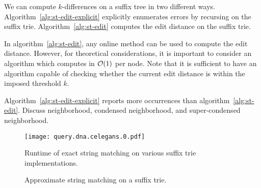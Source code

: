 We can compute $k$-differences on a suffix tree in two different ways. Algorithm~\ref{alg:st-edit-explicit} explicitly enumerates errors by recursing on the suffix trie. Algorithm~\ref{alg:st-edit} computes the edit distance on the suffix trie.

%

In algorithm~\ref{alg:st-edit}, any online method can be used to compute the edit distance.
However, for theoretical considerations, it is important to consider an algorithm which computes in $\mathcal{O}(1)$ per node.
Note that it is sufficient to have an algorithm capable of checking whether the current edit distance is within the imposed threshold $k$.

Algorithm~\ref{alg:st-edit-explicit} reports more occurrences than algorithm~\ref{alg:st-edit}.
Discuss neighborhood, condensed neighborhood, and super-condensed neighborhood.


\begin{figure}[h]
\begin{center}
\caption[Exact string matching runtime]{Runtime of exact string matching on various suffix trie implementations.}
\label{fig:query-dna-exact}
\texttt{[image: query.dna.celegans.0.pdf]}
\end{center}
\end{figure}

\begin{figure}[h]
\begin{center}
\caption{Approximate string matching on a suffix trie.}
\label{fig:st-hamming}

\end{center}
\end{figure}

